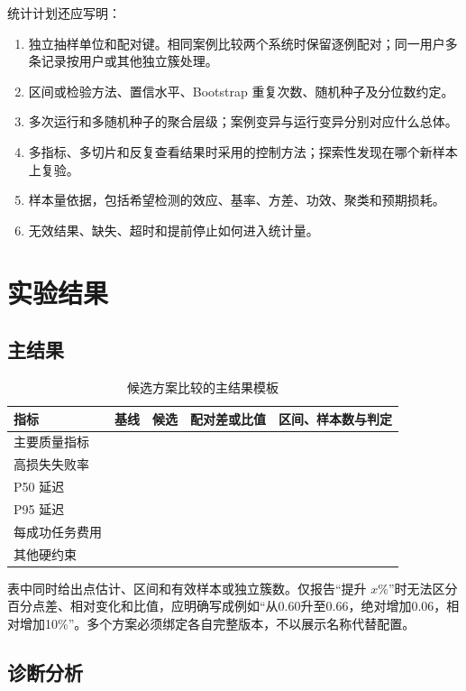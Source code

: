 \documentclass[../workbook.tex]{subfiles}
\begin{document}
统计计划还应写明：
\begin{enumerate}
 \item 独立抽样单位和配对键。相同案例比较两个系统时保留逐例配对；同一用户多条记录按用户或其他独立簇处理。
 \item 区间或检验方法、置信水平、Bootstrap 重复次数、随机种子及分位数约定。
 \item 多次运行和多随机种子的聚合层级；案例变异与运行变异分别对应什么总体。
 \item 多指标、多切片和反复查看结果时采用的控制方法；探索性发现在哪个新样本上复验。
 \item 样本量依据，包括希望检测的效应、基率、方差、功效、聚类和预期损耗。
 \item 无效结果、缺失、超时和提前停止如何进入统计量。
\end{enumerate}

\section{实验结果}

\subsection{主结果}

\begin{table}[htbp]
\centering
\caption{候选方案比较的主结果模板}\label{tab:appendix-main-results}
\begin{tabularx}{\linewidth}{p{.19\linewidth}p{.15\linewidth}p{.15\linewidth}p{.19\linewidth}X}
\toprule
指标 & 基线 & 候选 & 配对差或比值 & 区间、样本数与判定\\\midrule
主要质量指标 &  &  &  &  \\
高损失失败率 &  &  &  &  \\
P50 延迟 &  &  &  &  \\
P95 延迟 &  &  &  &  \\
每成功任务费用 &  &  &  &  \\
其他硬约束 &  &  &  &  \\
\bottomrule
\end{tabularx}
\end{table}

表中同时给出点估计、区间和有效样本或独立簇数。仅报告“提升 $x\%$”时无法区分百分点差、相对变化和比值，应明确写成例如“从0.60升至0.66，绝对增加0.06，相对增加10\%”。多个方案必须绑定各自完整版本，不以展示名称代替配置。

\subsection{诊断分析}
\end{document}
